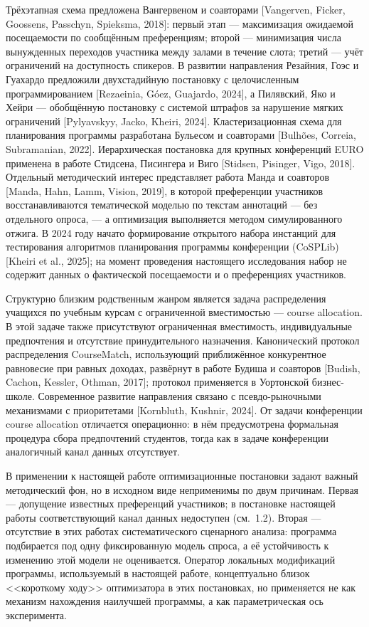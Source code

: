 Трёхэтапная схема предложена Вангервеном и соавторами [Vangerven, Ficker, Goossens, Passchyn, Spieksma, 2018]: первый этап --- максимизация ожидаемой посещаемости по сообщённым преференциям; второй --- минимизация числа вынужденных переходов участника между залами в течение слота; третий --- учёт ограничений на доступность спикеров. В развитии направления Резайния, Гоэс и Гуахардо предложили двухстадийную постановку с целочисленным программированием [Rezaeinia, Góez, Guajardo, 2024], а Пилявский, Яко и Хейри --- обобщённую постановку с системой штрафов за нарушение мягких ограничений [Pylyavskyy, Jacko, Kheiri, 2024]. Кластеризационная схема для планирования программы разработана Бульесом и соавторами [Bulhões, Correia, Subramanian, 2022]. Иерархическая постановка для крупных конференций EURO применена в работе Стидсена, Писингера и Виго [Stidsen, Pisinger, Vigo, 2018]. Отдельный методический интерес представляет работа Манда и соавторов [Manda, Hahn, Lamm, Vision, 2019], в которой преференции участников восстанавливаются тематической моделью по текстам аннотаций --- без отдельного опроса, --- а оптимизация выполняется методом симулированного отжига. В 2024 году начато формирование открытого набора инстанций для тестирования алгоритмов планирования программы конференции (CoSPLib) [Kheiri et al., 2025]; на момент проведения настоящего исследования набор не содержит данных о фактической посещаемости и о преференциях участников.

Структурно близким родственным жанром является задача распределения учащихся по учебным курсам с ограниченной вместимостью --- course allocation. В этой задаче также присутствуют ограниченная вместимость, индивидуальные предпочтения и отсутствие принудительного назначения. Канонический протокол распределения CourseMatch, использующий приближённое конкурентное равновесие при равных доходах, развёрнут в работе Будиша и соавторов [Budish, Cachon, Kessler, Othman, 2017]; протокол применяется в Уортонской бизнес-школе. Современное развитие направления связано с псевдо-рыночными механизмами с приоритетами [Kornbluth, Kushnir, 2024]. От задачи конференции course allocation отличается операционно: в нём предусмотрена формальная процедура сбора предпочтений студентов, тогда как в задаче конференции аналогичный канал данных отсутствует.

В применении к настоящей работе оптимизационные постановки задают важный методический фон, но в исходном виде неприменимы по двум причинам. Первая --- допущение известных преференций участников; в постановке настоящей работы соответствующий канал данных недоступен (см.~1.2). Вторая --- отсутствие в этих работах систематического сценарного анализа: программа подбирается под одну фиксированную модель спроса, а её устойчивость к изменению этой модели не оценивается. Оператор локальных модификаций программы, используемый в настоящей работе, концептуально близок <<короткому ходу>> оптимизатора в этих постановках, но применяется не как механизм нахождения наилучшей программы, а как параметрическая ось эксперимента.


